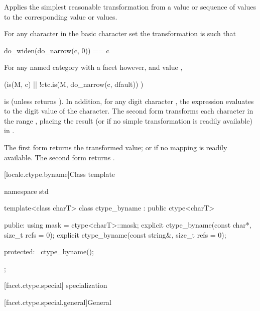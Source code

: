 \begin{itemdescr}
\pnum
\effects
Applies the simplest reasonable transformation
from a  value or sequence of  values
to the corresponding  value or values.

For any character  in the basic character set
the transformation is such that
\begin{codeblock}
do_widen(do_narrow(c, 0)) == c
\end{codeblock}

For any named  category with
a  facet  however, and
 value ,
\begin{codeblock}
(is(M, c) || !ctc.is(M, do_narrow(c, dfault)) )
\end{codeblock}
is  (unless  returns ).
In addition, for any digit character ,
the expression 
evaluates to the digit value of the character.
The second form transforms
each character  in the range ,
placing the result
(or  if no simple transformation is readily available)
in .

\pnum
\returns
The first form returns the transformed value;
or  if no mapping is readily available.
The second form returns .
\end{itemdescr}

[locale.ctype.byname]{Class template }

%
\begin{codeblock}
namespace std {
  template<class charT>
    class ctype_byname : public ctype<charT> {
    public:
      using mask = ctype<charT>::mask;
      explicit ctype_byname(const char*, size_t refs = 0);
      explicit ctype_byname(const string&, size_t refs = 0);

    protected:
      ~ctype_byname();
    };
}
\end{codeblock}

[facet.ctype.special]{ specialization}

[facet.ctype.special.general]{General}

